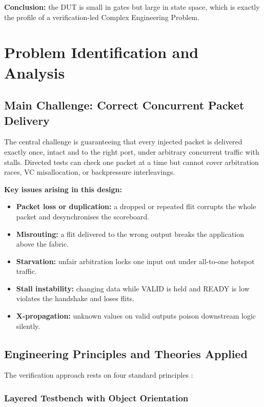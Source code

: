 \documentclass[11pt,a4paper]{report}  %
\begin{document}
\textbf{Conclusion:} the DUT is small in gates but large in state space, which
is exactly the profile of a verification-led Complex Engineering Problem.

\section{Problem Identification and Analysis}

\subsection{Main Challenge: Correct Concurrent Packet Delivery}

The central challenge is guaranteeing that every injected packet is delivered
exactly once, intact and to the right port, under arbitrary concurrent traffic
with stalls. Directed tests can check one packet at a time but cannot cover
arbitration races, VC misallocation, or backpressure interleavings.

\textbf{Key issues arising in this design:}
\begin{itemize}
    \item \textbf{Packet loss or duplication:} a dropped or repeated flit
    corrupts the whole packet and desynchronises the scoreboard.
    \item \textbf{Misrouting:} a flit delivered to the wrong output breaks the
    application above the fabric.
    \item \textbf{Starvation:} unfair arbitration locks one input out under
    all-to-one hotspot traffic.
    \item \textbf{Stall instability:} changing data while VALID is held and
    READY is low violates the handshake and loses flits.
    \item \textbf{X-propagation:} unknown values on valid outputs poison
    downstream logic silently.
\end{itemize}

\subsection{Engineering Principles and Theories Applied}

The verification approach rests on four standard principles
\cite{Spear}\cite{IEEE1800}:

\subsubsection{Layered Testbench with Object Orientation}
\end{document}
